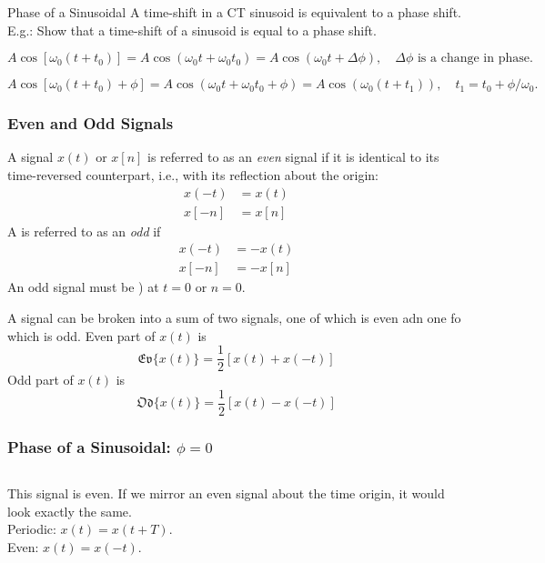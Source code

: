 \begin{frame}[plain]{Phase of a Sinusoidal}
    A time-shift in a CT sinusoid is equivalent to a phase shift.\\
    E.g.: Show that a time-shift of a sinusoid is equal to a phase shift.
    {
        \begin{equation*}
            A\cos[\omega_0(t + t_0)] = A\cos(\omega_0t + \omega_0t_0) = A\cos(\omega_0t + \Delta\phi),\quad \Delta\phi \text{ is a change in phase}.
        \end{equation*}

        \begin{equation*}
            A\cos[\omega_0(t + t_0) + \phi] = A\cos(\omega_0t + \omega_0t_0 + \phi) = A\cos(\omega_0(t + t_1)),\quad t_1 = t_0 + \phi/\omega_0.
        \end{equation*}
    }
\end{frame}

\begin{frame}[t]
\frametitle{Even and Odd Signals}
    A signal $x(t)$ or $x[n]$ is referred to as an \emph{even} signal if it is identical to its time-reversed counterpart, i.e., with its reflection about the origin:
    \begin{align*}
        x(-t) &= x(t)\\
        x[-n] &= x[n]
    \end{align*}
    A is referred to as an \emph{odd} if
    \begin{align*}
        x(-t) &= -x(t)\\
        x[-n] &= -x[n]
    \end{align*}   
    An odd signal must be ) at $t=0$ or $n=0$. 

    A signal can be broken into a sum of two signals, one of which is even adn one fo which is odd.
    Even part of $x(t)$ is
    \begin{equation*}
        \mathfrak{Ev}\{x(t)\} = \frac{1}{2}[x(t)+x(-t)]
    \end{equation*}
    Odd part of $x(t)$ is
    \begin{equation*}
        \mathfrak{Od}\{x(t)\} = \frac{1}{2}[x(t)-x(-t)]
    \end{equation*}   
\end{frame}


\begin{frame}[plain]\frametitle{Phase of a Sinusoidal: $\phi = 0$}
    {
        \begin{columns}[t]
            {
                \centering
                
            }
            {
                \noindent This signal is \alert{even}. If we mirror an even signal about the time origin, it would look exactly the same.\\[12pt]
                Periodic: $x(t) = x(t+ T)$.\\
                Even: $x(t) = x(-t)$.
            }
        \end{columns}
    }
\end{frame}

